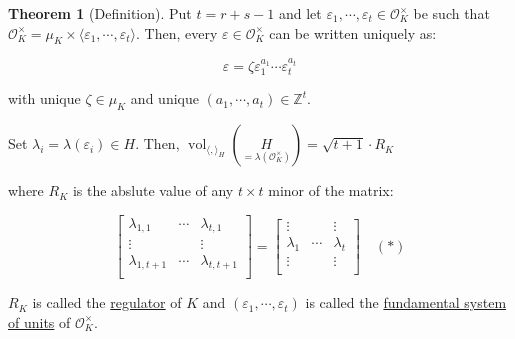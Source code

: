 \documentclass[openany]{amsbook}
\numberwithin{section}{chapter}
\theoremstyle{definition}
\newtheorem{theorem}{Theorem}[chapter]
\begin{document}
\begin{theorem}
    [Definition] Put \(t = r+s-1\) and let \(\varepsilon_1, \cdots , \varepsilon_t \in \mathcal{O}_K^\times\) be such that \(\mathcal{O}_K^\times = \mu_K \times \langle \varepsilon_1, \cdots , \varepsilon_t \rangle \). Then, every \(\varepsilon \in \mathcal{O}_K^\times \) can be written uniquely as:

    \[
        \varepsilon = \zeta \varepsilon_1^{a_1} \cdots \varepsilon_{t}^{a_t}
    \]

    with unique \(\zeta \in \mu_K\) and unique \((a_1, \cdots , a_t)\in \mathbb{Z}^t\).

    Set \(\lambda_i = \lambda(\varepsilon_i) \in H\). Then, \(\operatorname{vol}_{\langle , \rangle _H} (\underset{=\lambda(\mathcal{O}_K^\times)}{H}) = \sqrt{t+1} \cdot R_K\) 

    where \(R_K\) is the abslute value of any \(t \times t\) minor of the matrix: 
    
    \[
        \begin{bmatrix}
        \lambda_{1,1} & \cdots &  \lambda_{t,1} \\
        \vdots &  &  \vdots \\
        \lambda_{1,t+1} & \cdots &  \lambda_{t,t+1} \\
        \end{bmatrix} = \begin{bmatrix}
        \vdots &  &  \vdots \\
        \lambda_1 & \cdots &  \lambda _t \\
        \vdots &  &  \vdots \\
        \end{bmatrix} \quad (\ast)
    \]
    
    \(R_K\) is called the \underline{regulator} of \(K\) and \((\varepsilon_1, \cdots , \varepsilon_t)\) is called the \underline{fundamental system of units} of \(\mathcal{O}_K^\times \).
    
\end{theorem}
\end{document}
